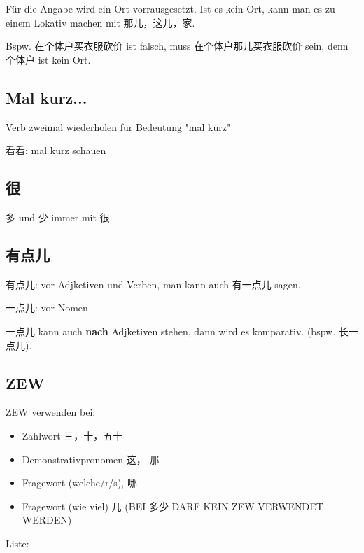 \documentclass[UTF8]{ctexart}
\begin{document}
Für die Angabe wird ein Ort vorrausgesetzt. Ist es kein Ort, kann man es zu einem Lokativ machen mit 那儿，这儿，家.

Bspw. 在个体户买衣服砍价 ist falsch, muss 在个体户那儿买衣服砍价 sein, denn 个体户 ist kein Ort.\\

\subsection{Mal kurz...}

Verb zweimal wiederholen für Bedeutung "mal kurz"

看看: mal kurz schauen

\subsection{很}

多 und 少 immer mit 很.

\subsection{有点儿}

有点儿: vor Adjketiven und Verben, man kann auch 有一点儿 sagen.

一点儿: vor Nomen

一点儿 kann auch \textbf{nach} Adjketiven stehen, dann wird es komparativ. (bspw. 长一点儿). 


\subsection{ZEW}

ZEW verwenden bei:

\begin{itemize}
    \item Zahlwort 三，十，五十
    \item Demonstrativpronomen 这， 那
    \item Fragewort (welche/r/s), 哪
    \item Fragewort (wie viel) 几 (BEI 多少 DARF KEIN ZEW VERWENDET WERDEN)
\end{itemize}

Liste:
\end{document}
